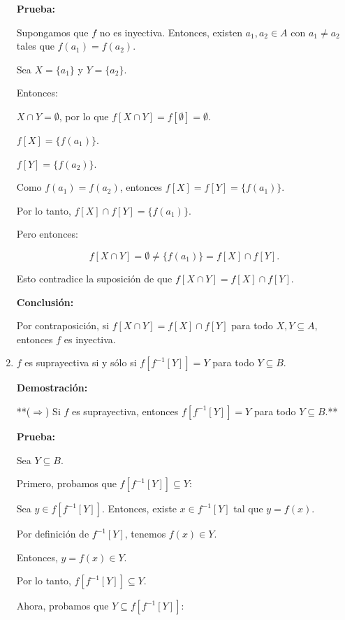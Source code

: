 \begin{solution}
\begin{enumerate}
    \textbf{Prueba:}
    
    Supongamos que \( f \) no es inyectiva. Entonces, existen \( a_1, a_2 \in A \) con \( a_1 \neq a_2 \) tales que \( f(a_1) = f(a_2) \).
    
    Sea \( X = \{ a_1 \} \) y \( Y = \{ a_2 \} \).
    
    Entonces:
    
    \( X \cap Y = \emptyset \), por lo que \( f[X \cap Y] = f[\emptyset] = \emptyset \).

    \( f[X] = \{ f(a_1) \} \).

    \( f[Y] = \{ f(a_2) \} \).

    Como \( f(a_1) = f(a_2) \), entonces \( f[X] = f[Y] = \{ f(a_1) \} \).
    
    Por lo tanto, \( f[X] \cap f[Y] = \{ f(a_1) \} \).
    
    Pero entonces:
    
    \[f[X \cap Y] = \emptyset \neq \{ f(a_1) \} = f[X] \cap f[Y].\]
    
    Esto contradice la suposición de que \( f[X \cap Y] = f[X] \cap f[Y] \).
    
    \textbf{Conclusión:}
    
    Por contraposición, si \( f[X \cap Y] = f[X] \cap f[Y] \) para todo \( X, Y \subseteq A \), entonces \( f \) es inyectiva.
    
    \item \( f \) es suprayectiva si y sólo si \( f[f^{-1}[Y]] = Y \) para todo \( Y \subseteq B \).
    
    \textbf{Demostración:}
    
    **($\Rightarrow$) Si \( f \) es suprayectiva, entonces \( f[f^{-1}[Y]] = Y \) para todo \( Y \subseteq B \).**
    
    \textbf{Prueba:}
    
    Sea \( Y \subseteq B \).
    
    Primero, probamos que \( f[f^{-1}[Y]] \subseteq Y \):
    
    Sea \( y \in f[f^{-1}[Y]] \). Entonces, existe \( x \in f^{-1}[Y] \) tal que \( y = f(x) \).
    
    Por definición de \( f^{-1}[Y] \), tenemos \( f(x) \in Y \).
    
    Entonces, \( y = f(x) \in Y \).
    
    Por lo tanto, \( f[f^{-1}[Y]] \subseteq Y \).
    
    Ahora, probamos que \( Y \subseteq f[f^{-1}[Y]] \):
    

\end{enumerate}
\end{solution}
